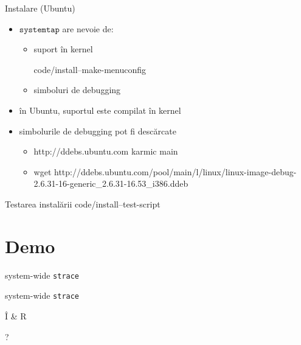 \documentclass{beamer}
\newcommand{\systemtap}{$\texttt{systemtap}$ }
\begin{document}
\begin{frame}{Instalare (Ubuntu)}
  \begin{itemize}
    \item \systemtap are nevoie de:
      \begin{itemize} 
      \item suport în kernel
        \begin{beamerboxesrounded}[lower=block body,shadow=true]
          \small  {code/install--make-menuconfig}
        \end{beamerboxesrounded}
      \item simboluri de debugging
      \end{itemize}
    \item în Ubuntu, suportul este compilat în kernel
    \item simbolurile de debugging pot fi descărcate
      \begin{itemize}
      \item http://ddebs.ubuntu.com karmic main
      \item wget http://ddebs.ubuntu.com/pool/main/l/linux/linux-image-debug-2.6.31-16-generic\_2.6.31-16.53\_i386.ddeb
      \end{itemize}
  \end{itemize}
\end{frame}


\begin{frame}{Testarea instalării}
   {code/install--test-script}
\end{frame}


\section{Demo}

\begin{frame}{system-wide \texttt{strace}}
  \small 
\end{frame}

\begin{frame}{system-wide \texttt{strace}}
  \small 
\end{frame}



\begin{frame}{Î \& R}
  \begin{centering}
    \Huge ?    \par
  \end{centering}
\end{frame}
\end{document}
